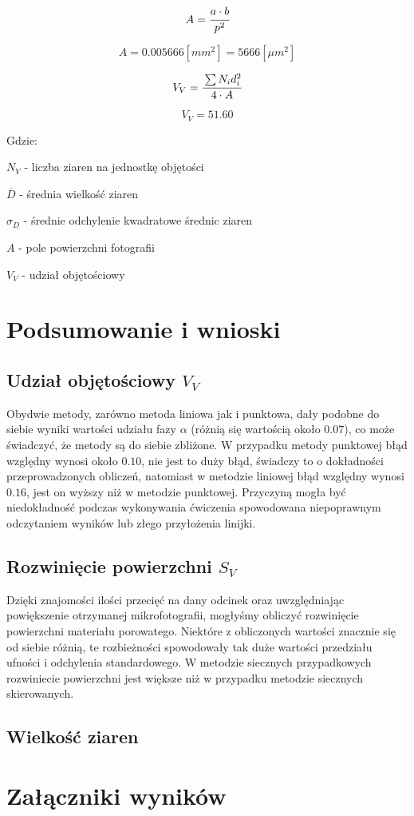 \documentclass[a4paper,12pt]{article}
\begin{document}
$$A=\cfrac{a\cdot b}{p^2}$$

$$A=0.005666[mm^2]=5666[\mu m^2]$$

$$V_V=\cfrac{\sum N_id_i^2}{4\cdot A}$$

$$V_V=51.60$$

Gdzie:

$N_V$ - liczba ziaren na jednostkę objętości

$\overline{D}$ - średnia wielkość ziaren

$\sigma_D$ - średnie odchylenie kwadratowe średnic ziaren

$A$ - pole powierzchni fotografii

$V_V$ - udział objętościowy

\section{Podsumowanie i wnioski}

\subsection{Udział objętościowy $V_V$}



Obydwie metody, zarówno metoda liniowa jak i punktowa, dały podobne  do siebie wyniki wartości udziału fazy $\alpha$ (różnią się wartością około $0.07$), co może świadczyć, że metody są do siebie zbliżone. W przypadku metody punktowej błąd względny wynosi  około $0.10$, nie jest to duży błąd, świadczy to  o dokładności przeprowadzonych obliczeń, natomiast w metodzie liniowej błąd względny wynosi  $0.16$, jest on wyższy niż w metodzie punktowej. Przyczyną mogła być niedokładność  podczas wykonywania  ćwiczenia spowodowana niepoprawnym odczytaniem wyników lub złego przyłożenia linijki.

\subsection{Rozwinięcie powierzchni $S_V$}



Dzięki znajomości ilości przecięć na dany odcinek oraz uwzględniając powiększenie otrzymanej mikrofotografii, mogłyśmy obliczyć rozwinięcie powierzchni materiału porowatego. Niektóre z obliczonych wartości znacznie się od siebie różnią, te rozbieżności spowodowały tak duże wartości przedziału ufności i odchylenia standardowego. W metodzie siecznych przypadkowych rozwiniecie powierzchni jest większe niż w przypadku metodzie siecznych skierowanych.

\subsection{Wielkość ziaren}

\section{Załączniki wyników}
\end{document}
